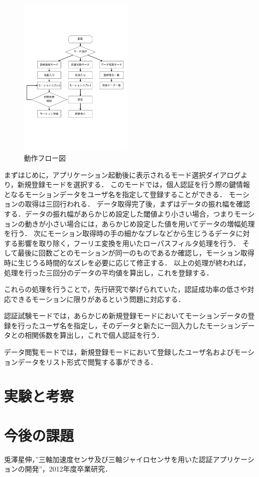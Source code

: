 \documentclass[11pt]{jarticle}
\begin{document}
\begin{figure}
    \begin{center}
        \includegraphics[width=55mm, bb=0 183 594 670]{Flow.pdf}
        \caption{動作フロー図}
        \label{flow}
    \end{center}
\end{figure}

まずはじめに，アプリケーション起動後に表示されるモード選択ダイアログより，新規登録モードを選択する．
このモードでは，個人認証を行う際の鍵情報となるモーションデータをユーザ名を指定して登録することができる．
モーションの取得は三回行われる．
データ取得完了後，まずはデータの振れ幅を確認する．データの振れ幅があらかじめ設定した閾値より小さい場合，つまりモーションの動きが小さい場合には，あらかじめ設定した値を用いてデータの増幅処理を行う．
次にモーション取得時の手の細かなブレなどから生じうるデータに対する影響を取り除く，フーリエ変換を用いたローパスフィルタ処理を行う．
そして最後に回数ごとのモーションが同一のものであるか確認し，モーション取得時に生じうる時間的なズレを必要に応じて修正する．
以上の処理が終われば，処理を行った三回分のデータの平均値を算出し，これを登録する．

これらの処理を行うことで，先行研究で挙げられていた，認証成功率の低さや対応できるモーションに限りがあるという問題に対応する．

認証試験モードでは，あらかじめ新規登録モードにおいてモーションデータの登録を行ったユーザ名を指定し，そのデータと新たに一回入力したモーションデータとの相関係数を算出し，これで個人認証を行う．

データ閲覧モードでは，新規登録モードにおいて登録したユーザ名およびモーションデータをリスト形式で閲覧する事ができる．

\section{実験と考察}

\section{今後の課題}

\begin{thebibliography}{9}
    兎澤星伸，”三軸加速度センサ及び三軸ジャイロセンサを用いた認証アプリケーションの開発”，2012年度卒業研究．
\end{thebibliography}
\end{document}
